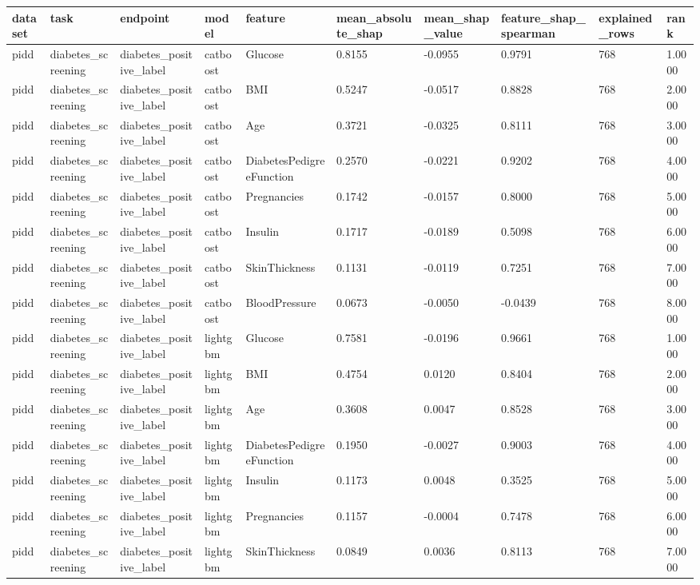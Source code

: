 \begin{tabular}{llllllllll}
\hline
dataset & task & endpoint & model & feature & mean\_absolute\_shap & mean\_shap\_value & feature\_shap\_spearman & explained\_rows & rank \\
\hline
pidd & diabetes\_screening & diabetes\_positive\_label & catboost & Glucose & 0.8155 & -0.0955 & 0.9791 & 768 & 1.0000 \\
pidd & diabetes\_screening & diabetes\_positive\_label & catboost & BMI & 0.5247 & -0.0517 & 0.8828 & 768 & 2.0000 \\
pidd & diabetes\_screening & diabetes\_positive\_label & catboost & Age & 0.3721 & -0.0325 & 0.8111 & 768 & 3.0000 \\
pidd & diabetes\_screening & diabetes\_positive\_label & catboost & DiabetesPedigreeFunction & 0.2570 & -0.0221 & 0.9202 & 768 & 4.0000 \\
pidd & diabetes\_screening & diabetes\_positive\_label & catboost & Pregnancies & 0.1742 & -0.0157 & 0.8000 & 768 & 5.0000 \\
pidd & diabetes\_screening & diabetes\_positive\_label & catboost & Insulin & 0.1717 & -0.0189 & 0.5098 & 768 & 6.0000 \\
pidd & diabetes\_screening & diabetes\_positive\_label & catboost & SkinThickness & 0.1131 & -0.0119 & 0.7251 & 768 & 7.0000 \\
pidd & diabetes\_screening & diabetes\_positive\_label & catboost & BloodPressure & 0.0673 & -0.0050 & -0.0439 & 768 & 8.0000 \\
pidd & diabetes\_screening & diabetes\_positive\_label & lightgbm & Glucose & 0.7581 & -0.0196 & 0.9661 & 768 & 1.0000 \\
pidd & diabetes\_screening & diabetes\_positive\_label & lightgbm & BMI & 0.4754 & 0.0120 & 0.8404 & 768 & 2.0000 \\
pidd & diabetes\_screening & diabetes\_positive\_label & lightgbm & Age & 0.3608 & 0.0047 & 0.8528 & 768 & 3.0000 \\
pidd & diabetes\_screening & diabetes\_positive\_label & lightgbm & DiabetesPedigreeFunction & 0.1950 & -0.0027 & 0.9003 & 768 & 4.0000 \\
pidd & diabetes\_screening & diabetes\_positive\_label & lightgbm & Insulin & 0.1173 & 0.0048 & 0.3525 & 768 & 5.0000 \\
pidd & diabetes\_screening & diabetes\_positive\_label & lightgbm & Pregnancies & 0.1157 & -0.0004 & 0.7478 & 768 & 6.0000 \\
pidd & diabetes\_screening & diabetes\_positive\_label & lightgbm & SkinThickness & 0.0849 & 0.0036 & 0.8113 & 768 & 7.0000 \\

\end{tabular}
